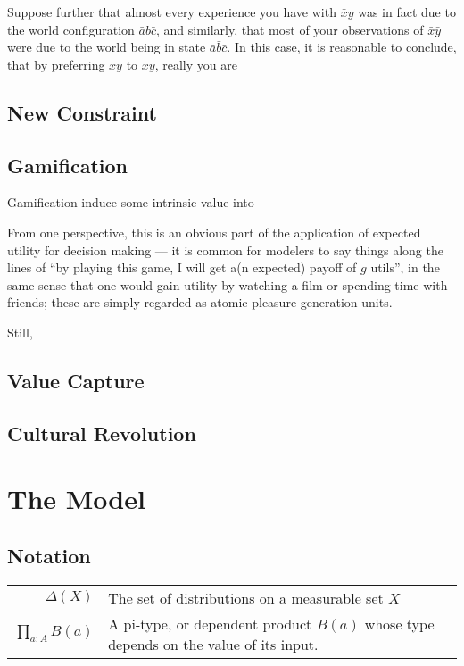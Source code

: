 \documentclass{book}
\begin{document}
	Suppose further that almost every experience you have with $\bar x y$ was in fact due to the world configuration $\bar a b \bar c$, and similarly, that most of your observations of $\bar x \bar y$ were due to the world being in state $\bar a \bar b \bar c$. In this case, it is reasonable to conclude, that by preferring $\bar x y$ to $\bar x \bar y$, really you are 
	
	
	\section{New Constraint}
	
	\section{Gamification}
	Gamification induce some intrinsic value into 
	
	From one perspective, this is an obvious part of the application of expected utility for decision making --- it is common for modelers to say things along the lines of ``by playing this game, I will get a(n expected) payoff of $g$ utils'', in the same sense that one would gain utility by watching a film or spending time with friends; these are simply regarded as atomic pleasure generation units.
	
	Still, 
	
	\section{Value Capture}
	
	
	\section{Cultural Revolution}
	
	
	\chapter{The Model}
	\section{Notation}
	
	\begin{tabular}{r|l}
		$\Delta(X)$ & The set of distributions on a measurable set $X$ \\
		$\prod_{a : A} B(a)$ & A pi-type, or dependent product $B(a)$ whose type depends on the value of its input. 
	\end{tabular}
	
\end{document}
